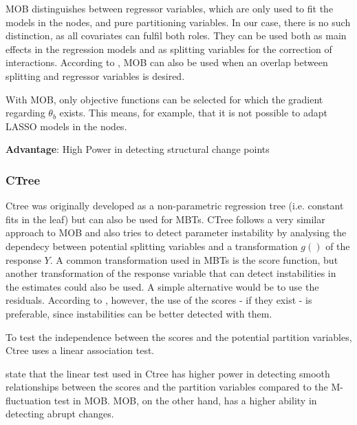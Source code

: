 MOB distinguishes between regressor variables, which are only used to fit the models in the nodes, and pure partitioning variables. In our case, there is no such distinction, as all covariates can fulfil both roles.  They can be used both as main effects in the regression models and as splitting variables for the correction of interactions.
According to \citep{Zeileis.2008}, MOB can also be used when an overlap between splitting and regressor variables is desired.

With MOB, only objective functions can be selected for which the gradient regarding $\theta_b$  exists. This means, for example, that it is not possible to adapt LASSO models in the nodes.






\textbf{Advantage}: High Power in detecting structural change points

\subsubsection{CTree}
Ctree was originally developed as a non-parametric regression tree (i.e. constant fits in the leaf) but can also be used for MBTs.
CTree follows a very similar approach to MOB and also tries to detect parameter instability by analysing the dependecy between potential splitting variables and a transformation $g()$ of the response $Y$.
A common transformation used in MBTs is the score function, but another transformation of the response variable that can detect instabilities in the estimates could also be used. A simple alternative would be to use the residuals. According to \citep{Schlosser.2019}, however, the use of the scores - if they exist - is preferable, since instabilities can be better detected with them.

To test the independence between the scores and the potential partition variables, Ctree uses a linear association test.


\citep{Schlosser.2019} state that the linear test used in Ctree has higher power in detecting smooth relationships between the scores and the partition variables compared to the M-fluctuation test in MOB. MOB, on the other hand, has a higher ability in detecting abrupt changes.


